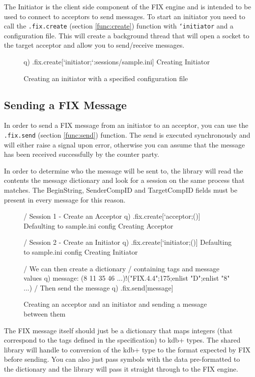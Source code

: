 The Initiator is the client side component of the FIX engine and is intended to be used to connect to acceptors to send messages. To start an initiator you need to call the \texttt{.fix.create} (section \ref{func:create}) function with \texttt{`initiator} and a configuration file. This will create a background thread that will open a socket to the target acceptor and allow you to send/receive messages.

\begin{figure}[H]
\begin{qcode}
q) .fix.create[`initiator;`:sessions/sample.ini]
Creating Initiator
\end{qcode}
\caption{Creating an initiator with a specified configuration file}
\end{figure}


\subsection{Sending a FIX Message}
In order to send a FIX message from an initiator to an acceptor, you can use the \texttt{.fix.send} (section \ref{func:send}) function. The send is executed
synchronously and will either raise a signal upon error, otherwise you can assume that
the message has been received successfully by the counter party. 

In order to determine who the message will be sent to, the library will read the contents
the message dictionary and look for a session on the same process that matches. The BeginString,
SenderCompID and TargetCompID fields must be present in every message for this reason.

\begin{figure}[H]
\begin{qcode}
/ Session 1 - Create an Acceptor
q) .fix.create[`acceptor;()]
Defaulting to sample.ini config
Creating Acceptor

/ Session 2 - Create an Initiator
q) .fix.create[`initiator;()]
Defaulting to sample.ini config
Creating Initiator

/ We can then create a dictionary
/ containing tags and message values
q) message: (8 11 35 46 ...)!("FIX.4.4";175;enlist "D";enlist "8" ...)
/ Then send the message
q) .fix.send[message]
\end{qcode}
\caption{Creating an acceptor and an initiator and sending a message between them}
\end{figure}

The FIX message itself should just be a dictionary that maps integers (that correspond to the tags defined in the specification) to kdb+ types. The shared library will handle to conversion of the kdb+ type to the format expected by FIX before sending. You can also just pass symbols with the data pre-formatted to the dictionary and the library will pass it straight through to the FIX engine.

